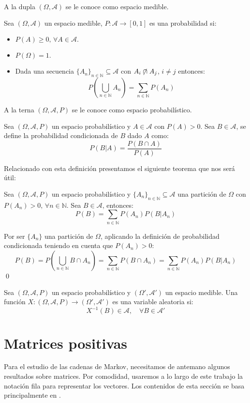 A la dupla $(\Omega,\mathcal{A})$ se le conoce como espacio medible.
\begin{definition}
    Sea $(\Omega,\mathcal{A})$ un espacio medible, $P:\mathcal{A}\longrightarrow [0,1]$ es una probabilidad si:
    \begin{itemize}
        \item $P(A)\geq 0, \, \forall A\in\mathcal{A}.$
        \item $P(\Omega)=1.$
        \item Dada una secuencia $\{A_{n}\}_{n\in\mathbb{N}}\subseteq\mathcal{A}$ con $A_i\centernot\cap A_j$, $i\neq j$ entonces:
        \[P\left(\bigcup_{n\in\mathbb{N}}A_n\right)=\sum_{n\in\mathbb{N}}P(A_n)\]
    \end{itemize}
\end{definition}
A la terna $(\Omega,\mathcal{A},P)$ se le conoce como espacio probabilístico.
\begin{definition}
    Sea $(\Omega,\mathcal{A},P)$ un espacio probabilístico y $A\in\mathcal{A}$ con $P(A)>0$. Sea $B\in\mathcal{A}$, se define la probabilidad condicionada de $B$ dado $A$ como:
    \[P(B|A)=\dfrac{P(B\cap A)}{P(A)}\]
\end{definition}
Relacionado con esta definición presentamos el siguiente teorema que nos será útil:
\begin{theorem}
    Sea $(\Omega,\mathcal{A},P)$ un espacio probabilístico y $\{A_{n}\}_{n\in\mathbb{N}}\subseteq\mathcal{A}$ una partición de $\Omega$ con $P(A_n)>0, \,\forall n \in \mathbb{N}$. Sea $B\in\mathcal{A}$, entonces:
    \[P(B)=\sum_{n\in\mathbb{N}}P(A_n)P(B|A_n)\]
\end{theorem}
\begin{proofs*}
    Por ser $\{A_n\}$ una partición de $\Omega$, aplicando la definición de probabilidad condicionada teniendo en cuenta que $P(A_n)>0$:
    \[P(B)=P\left(\bigcup_{n\in\mathbb{N}}B\cap A_n\right)=\sum_{n\in\mathbb{N}}P(B\cap A_n)
        =\sum_{n\in\mathbb{N}}P(A_n)P(B|A_n)\]\qed
\end{proofs*}

\begin{definition}
 Sea $(\Omega,\mathcal{A},P)$ un espacio probabilístico y $(\Omega',\mathcal{A}')$ un espacio medible. Una función $X:(\Omega,\mathcal{A},P)\longrightarrow(\Omega',\mathcal{A}')$ es una variable aleatoria si:
 \[X^{-1}(B)\in\mathcal{A}, \quad \forall B\in\mathcal{A}'\]
\end{definition}

\section{Matrices positivas}
Para el estudio de las cadenas de Markov, necesitamos de antemano algunos resultados sobre matrices. Por comodidad, usaremos a lo largo de este trabajo la notación fila para representar los vectores. Los contenidos de esta sección se basa principalmente en \cite{Salinelli}.

